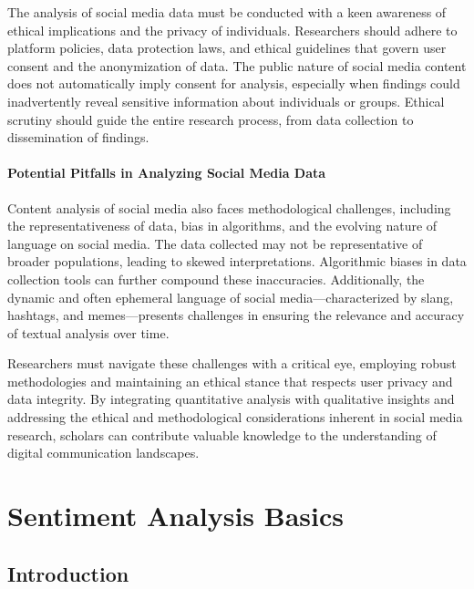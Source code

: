 \documentclass[
]{book}
\begin{document}
The analysis of social media data must be conducted with a keen awareness of ethical implications and the privacy of individuals. Researchers should adhere to platform policies, data protection laws, and ethical guidelines that govern user consent and the anonymization of data. The public nature of social media content does not automatically imply consent for analysis, especially when findings could inadvertently reveal sensitive information about individuals or groups. Ethical scrutiny should guide the entire research process, from data collection to dissemination of findings.

\hypertarget{potential-pitfalls-in-analyzing-social-media-data}{%
\subsubsection{Potential Pitfalls in Analyzing Social Media Data}\label{potential-pitfalls-in-analyzing-social-media-data}}

Content analysis of social media also faces methodological challenges, including the representativeness of data, bias in algorithms, and the evolving nature of language on social media. The data collected may not be representative of broader populations, leading to skewed interpretations. Algorithmic biases in data collection tools can further compound these inaccuracies. Additionally, the dynamic and often ephemeral language of social media---characterized by slang, hashtags, and memes---presents challenges in ensuring the relevance and accuracy of textual analysis over time.

Researchers must navigate these challenges with a critical eye, employing robust methodologies and maintaining an ethical stance that respects user privacy and data integrity. By integrating quantitative analysis with qualitative insights and addressing the ethical and methodological considerations inherent in social media research, scholars can contribute valuable knowledge to the understanding of digital communication landscapes.

\hypertarget{sentiment-analysis-basics}{%
\chapter{Sentiment Analysis Basics}\label{sentiment-analysis-basics}}

\hypertarget{introduction-1}{%
\section{Introduction}\label{introduction-1}}
\end{document}

